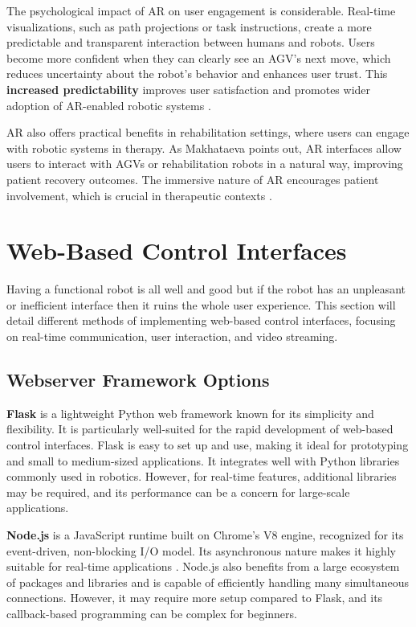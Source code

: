 The psychological impact of AR on user engagement is considerable. Real-time visualizations, such as path projections or task instructions, create a more predictable and transparent interaction between humans and robots. Users become more confident when they can clearly see an AGV's next move, which reduces uncertainty about the robot's behavior and enhances user trust. This \textbf{increased predictability} improves user satisfaction and promotes wider adoption of AR-enabled robotic systems \cite{Coovert2014}.

AR also offers practical benefits in rehabilitation settings, where users can engage with robotic systems in therapy. As Makhataeva \cite{Makhataeva2020} points out, AR interfaces allow users to interact with AGVs or rehabilitation robots in a natural way, improving patient recovery outcomes. The immersive nature of AR encourages patient involvement, which is crucial in therapeutic contexts \cite{Makhataeva2020}.

\section{Web-Based Control Interfaces}
Having a functional robot is all well and good but if the robot has an unpleasant or inefficient interface then it ruins the whole user experience. This section will detail different methods of implementing web-based control interfaces, focusing on real-time communication, user interaction, and video streaming. 

\subsection{Webserver Framework Options}

\textbf{Flask} is a lightweight Python web framework known for its simplicity and flexibility\cite{moraneus2024}. It is particularly well-suited for the rapid development of web-based control interfaces. Flask is easy to set up and use, making it ideal for prototyping and small to medium-sized applications. It integrates well with Python libraries commonly used in robotics. However, for real-time features, additional libraries may be required, and its performance can be a concern for large-scale applications.

\textbf{Node.js} is a JavaScript runtime built on Chrome’s V8 engine, recognized for its event-driven, non-blocking I/O model. Its asynchronous nature makes it highly suitable for real-time applications \cite{asiandigitalhub2023}. Node.js also benefits from a large ecosystem of packages and libraries and is capable of efficiently handling many simultaneous connections. However, it may require more setup compared to Flask, and its callback-based programming can be complex for beginners.

